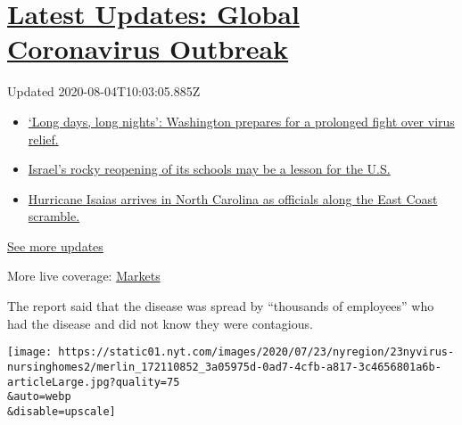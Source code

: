 \hypertarget{latest-updates-global-coronavirus-outbreak}{%
\section{\texorpdfstring{\href{https://www.nytimes.com/2020/08/04/world/coronavirus-covid-19.html?action=click\&pgtype=Article\&state=default\&region=MAIN_CONTENT_1\&context=storylines_live_updates}{Latest
Updates: Global Coronavirus
Outbreak}}{Latest Updates: Global Coronavirus Outbreak}}\label{latest-updates-global-coronavirus-outbreak}}

Updated 2020-08-04T10:03:05.885Z

\begin{itemize}
\tightlist
\item
  \href{https://www.nytimes.com/2020/08/04/world/coronavirus-covid-19.html?action=click\&pgtype=Article\&state=default\&region=MAIN_CONTENT_1\&context=storylines_live_updates\#link-6b644638}{`Long
  days, long nights': Washington prepares for a prolonged fight over
  virus relief.}
\item
  \href{https://www.nytimes.com/2020/08/04/world/coronavirus-covid-19.html?action=click\&pgtype=Article\&state=default\&region=MAIN_CONTENT_1\&context=storylines_live_updates\#link-7af9fca0}{Israel's
  rocky reopening of its schools may be a lesson for the U.S.}
\item
  \href{https://www.nytimes.com/2020/08/04/world/coronavirus-covid-19.html?action=click\&pgtype=Article\&state=default\&region=MAIN_CONTENT_1\&context=storylines_live_updates\#link-33bf9168}{Hurricane
  Isaias arrives in North Carolina as officials along the East Coast
  scramble.}
\end{itemize}

\href{https://www.nytimes.com/2020/08/04/world/coronavirus-covid-19.html?action=click\&pgtype=Article\&state=default\&region=MAIN_CONTENT_1\&context=storylines_live_updates}{See
more updates}

More live coverage:
\href{https://www.nytimes.com/live/2020/08/03/business/stock-market-today-coronavirus?action=click\&pgtype=Article\&state=default\&region=MAIN_CONTENT_1\&context=storylines_live_updates}{Markets}

The report said that the disease was spread by ``thousands of
employees'' who had the disease and did not know they were contagious.

\texttt{[image: https://static01.nyt.com/images/2020/07/23/nyregion/23nyvirus-nursinghomes2/merlin\_172110852\_3a05975d-0ad7-4cfb-a817-3c4656801a6b-articleLarge.jpg?quality=75\\\&auto=webp\\\&disable=upscale]}

